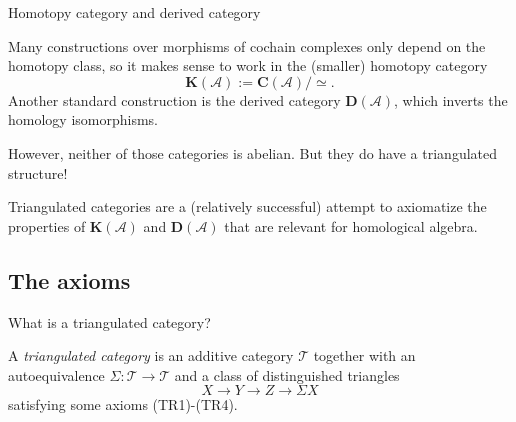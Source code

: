\documentclass{beamer}
\begin{document}
\begin{frame}{Homotopy category and derived category}

    Many constructions over morphisms of cochain complexes only depend on the homotopy class, so it makes sense to work in the (smaller) homotopy category
    $$\mathbf{K}(\mathscr{A}) := \mathbf{C}(\mathscr{A})/\simeq.$$
    Another standard construction is the derived category $\mathbf{D}(\mathscr{A})$, which inverts the homology isomorphisms. \pause
    
  \vspace{3mm}
  However, neither of those categories is abelian. \pause But they do have a triangulated structure!

  \vspace{3mm}
  Triangulated categories are a (relatively successful) attempt to axiomatize the properties of $\mathbf{K}(\mathscr{A})$ and $\mathbf{D}(\mathscr{A})$ that are relevant for homological algebra.
  
\end{frame}





\subsection{The axioms}

\begin{frame}[allowframebreaks]{What is a triangulated category?}
    \begin{definition}
      A \textit{triangulated category} is an additive category $\mathscr{T}$ together with an autoequivalence $\Sigma\colon \mathscr{T}\to\mathscr{T}$ and a class of distinguished triangles 
    $$X\to Y\to Z\to \Sigma X$$ 
    satisfying some axioms (TR1)-(TR4).
    \end{definition}
\end{frame}
\end{document}
